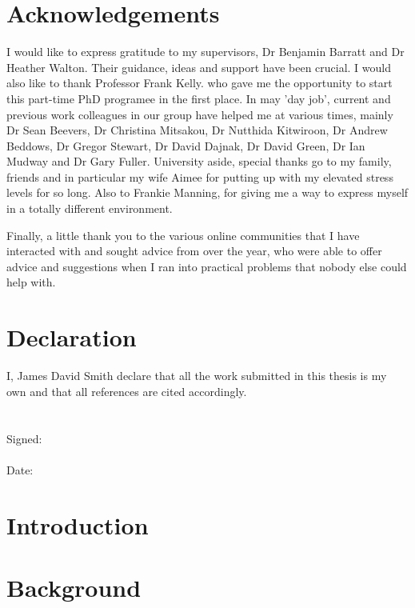 \documentclass[12pt]{report}
\begin{document}
\chapter*{Acknowledgements}
I would like to express gratitude to my supervisors, Dr Benjamin Barratt and Dr Heather Walton. Their guidance, ideas and support have been crucial. I would also like to thank Professor Frank Kelly. who gave me the opportunity to start this part-time PhD programee in the first place. In may 'day job', current and previous work colleagues in our group have helped me at various times, mainly Dr Sean Beevers, Dr Christina Mitsakou, Dr Nutthida Kitwiroon, Dr Andrew Beddows, Dr Gregor Stewart, Dr David Dajnak, Dr David Green, Dr Ian Mudway and Dr Gary Fuller. University aside, special thanks go to my family, friends and in particular my wife Aimee for putting up with my elevated stress levels for so long. Also to Frankie Manning, for giving me a way to express myself in a totally different environment.

Finally, a little thank you to the various online communities that I have interacted with and sought advice from over the year, who were able to offer advice and suggestions when I ran into practical problems that nobody else could help with.

\chapter*{Declaration}

I, James David Smith declare that all the work submitted in this thesis is my own and that all references are cited accordingly.\\
\\
\\
Signed: \underline{\hspace{6cm}}
\\
\\
Date: \hspace{0.16cm} \underline{\hspace{6cm}}

\tableofcontents
\listoffigures
\listoftables

\chapter{Introduction}

\label{chap:intro}

\chapter{Background}

\label{chap:background}

\label{chap:dynamic_exposure}
\end{document}
